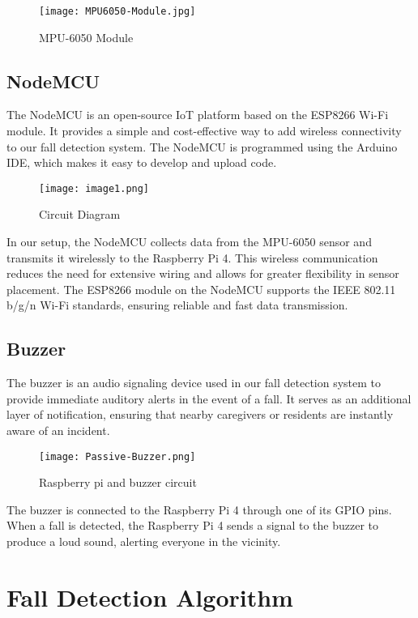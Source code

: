 \documentclass[final,5p,times,twocolumn,authoryear]{elsarticle}
\begin{document}
\begin{figure}
    \centering
    \texttt{[image: MPU6050-Module.jpg]}
    \caption{MPU-6050 Module}
    \label{fig:enter-label}
\end{figure}

\subsection{NodeMCU}

The NodeMCU is an open-source IoT platform based on the ESP8266 Wi-Fi module. It provides a simple and cost-effective way to add wireless connectivity to our fall detection system. The NodeMCU is programmed using the Arduino IDE, which makes it easy to develop and upload code. 

\begin{figure}
    \centering
    \texttt{[image: image1.png]}
    \caption{Circuit Diagram}
    \label{fig:enter-label}
\end{figure}

In our setup, the NodeMCU collects data from the MPU-6050 sensor and transmits it wirelessly to the Raspberry Pi 4. This wireless communication reduces the need for extensive wiring and allows for greater flexibility in sensor placement. The ESP8266 module on the NodeMCU supports the IEEE 802.11 b/g/n Wi-Fi standards, ensuring reliable and fast data transmission. 

\subsection{Buzzer}

The buzzer is an audio signaling device used in our fall detection system to provide immediate auditory alerts in the event of a fall. It serves as an additional layer of notification, ensuring that nearby caregivers or residents are instantly aware of an incident. 

\begin{figure}
    \centering
    \texttt{[image: Passive-Buzzer.png]}
    \caption{Raspberry pi and buzzer circuit}
    \label{fig:enter-label}
\end{figure}

The buzzer is connected to the Raspberry Pi 4 through one of its GPIO pins. When a fall is detected, the Raspberry Pi 4 sends a signal to the buzzer to produce a loud sound, alerting everyone in the vicinity. 

\section{Fall Detection Algorithm}
\end{document}
